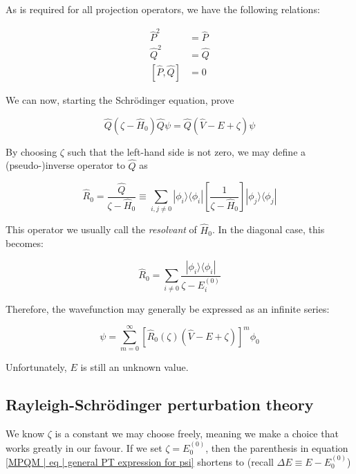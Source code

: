 \documentclass[10pt]{report}
\begin{document}
	As is required for all projection operators, we have the following relations:
	
	\begin{align}
		\hat{P}^2 &= \hat{P} \\
		\hat{Q}^2 &= \hat{Q} \\
		[\hat{P},\hat{Q}] &= 0
	\end{align}
	
	We can now, starting the Schr\"odinger equation, prove
	
	\begin{equation}
		\hat{Q}(\zeta - \hat{H}_0)\hat{Q}\psi = \hat{Q}(\hat{V}-E+\zeta)\psi
	\end{equation}
	
	By choosing $\zeta$ such that the left-hand side is not zero, we may define a (pseudo-)inverse operator to $\hat{Q}$ as
	
	\begin{equation}
		\hat{R}_0 = \frac{\hat{Q}}{\zeta - \hat{H}_0} \equiv \sum_{i,j\neq 0} |\phi_i\rangle\langle\phi_i|\left[\frac{1}{\zeta-\hat{H}_0}\right]|\phi_j\rangle\langle\phi_j|
	\end{equation}
	
	This operator we usually call the \emph{resolvant} of $\hat{H}_0$. In the diagonal case, this becomes:
	
	\begin{equation}
	\hat{R}_0 = \sum_{i\neq 0} \frac{|\phi_i\rangle\langle\phi_i|}{\zeta-E_i^{(0)}}
	\end{equation}
	
	Therefore, the wavefunction may generally be expressed as an infinite series:
	
	\begin{equation}
		\psi = \sum_{m=0}^\infty \left[ \hat{R}_0(\zeta)(\hat{V} - E + \zeta) \right]^m\phi_0
		\label{MPQM | eq | general PT expression for psi}
	\end{equation}
	
	Unfortunately, $E$ is still an unknown value.
	
	\subsection{Rayleigh-Schr\"odinger perturbation theory}
	We know $\zeta$ is a constant we may choose freely, meaning we make a choice that works greatly in our favour. If we set $\zeta=E_0^{(0)}$, then the parenthesis in equation \ref{MPQM | eq | general PT expression for psi} shortens to (recall $\Delta E \equiv E-E_0^{(0)}$)
	
\end{document}
